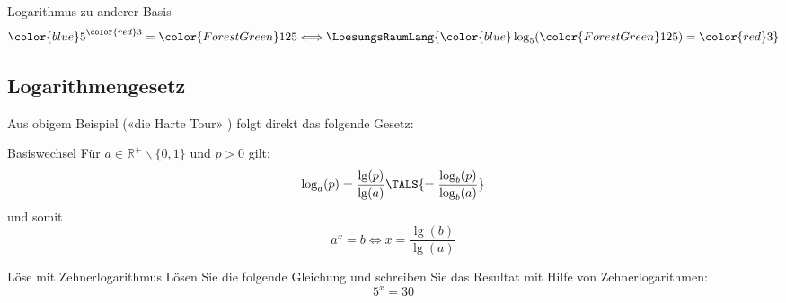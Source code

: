  \begin{beispiel}{Logarithmus zu anderer Basis}{}
$$   {\color{blue}5}^{\color{red}3} = {\color{ForestGreen}125}
   \Longleftrightarrow \LoesungsRaumLang{{\color{blue}\log_5}({\color{ForestGreen}125}) = {\color{red}3}}$$
   \end{beispiel}
 
\newpage


 \subsection{Logarithmengesetz}
Aus obigem Beispiel («die Harte Tour» ) folgt direkt das folgende Gesetz:

\begin{gesetz}{Basiswechsel}{}
  Für $a\in\mathbb{R}^{+}\backslash\{0,1\}$ und $p>0$ gilt:
  $$\log_a(p) = \frac{\lg(p)}{\lg(a)}\TALS{ =
    \frac{\log_b(p)}{\log_b(a)}}$$
  und somit
  $$a^x=b \Longleftrightarrow x= \frac{\lg(b)}{\lg(a)}$$
\end{gesetz}





\begin{beispiel}{Löse mit Zehnerlogarithmus}{}
  Lösen Sie die folgende Gleichung und schreiben Sie das Resultat mit
  Hilfe von Zehnerlogarithmen:
  $$5^x = 30$$
\end{beispiel}


